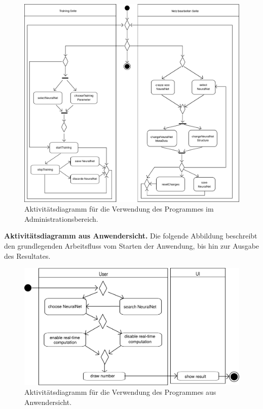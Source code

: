 \begin{figure}[H]
\begin{center}
\includegraphics[width=\textwidth]{Abbildungen/UML/jan/trainingConfigAD.png}
\caption{Aktivitätsdiagramm für die Verwendung des Programmes im Administrationsbereich.}
\label{fig_trainingConfigAD}
\end{center}
\end{figure}

\textbf{Aktivitätsdiagramm aus Anwendersicht.} Die folgende Abbildung beschreibt den grundlegenden Arbeitsfluss vom Starten der Anwendung, bis hin zur Ausgabe des Resultates.
\begin{figure}[H]
\begin{center}
\includegraphics[width=\textwidth]{Abbildungen/UML/uml_ronny/AD_UI.png}
\caption{Aktivitätsdiagramm für die Verwendung des Programmes aus Anwendersicht.}
\label{fig_AD_UI}
\end{center}
\end{figure}


